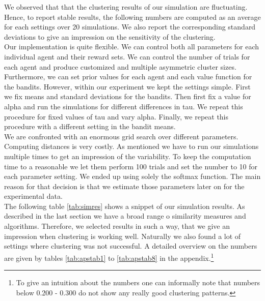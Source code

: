 \documentclass[12pt,a4paper,bibliography=totocnumbered,listof=totocnumbered]{scrartcl}
\begin{document}
We observed that that the clustering results of our simulation are fluctuating. Hence, to report stable results, the following numbers are computed as an average for each settings over 20 simulations. We also report the corresponding standard deviations to give an impression on the sensitivity of the clustering.\\
Our implementation is quite flexible. We can control both all parameters for each individual agent and their reward sets. We can control the number of trials for each agent and produce customized and multiple asymmetric cluster sizes. Furthermore, we can set prior values for each agent and each value function for the bandits. However, within our experiment we kept the settings simple. First we fix means and standard deviations for the bandits. Then first fix a value for alpha and run the simulations for different differences in tau. We repeat this procedure for fixed values of tau and vary alpha. Finally, we repeat this procedure with a different setting in the bandit means.\\
We are confronted with an enormous grid search over different parameters. Computing distances is very costly. As mentioned we have to run our simulations multiple times to get an impression of the variability. To keep the computation time to a reasonable we let them perform 100 trials and set the number to 10 for each parameter setting. We ended up using solely the softmax function. The main reason for that decision is that we estimate those parameters later on for the experimental data.\\ 
The following table \ref{tab:simres}  shows a snippet of our simulation results. As described in the last section we have a broad range o similarity measures and algorithms. Therefore, we selected results in such a way, that we give an impression when clustering is working well. Naturally we also found a lot of settings where clustering was not successful. A detailed overview on the numbers are given by tables \ref{tab:apstab1} to \ref{tab:apstab8} in the appendix.\footnote{To give an intuition about the numbers one can informally note that numbers below 0.200 - 0.300 do not show any really good clustering patterns.}
\pagebreak
\end{document}
